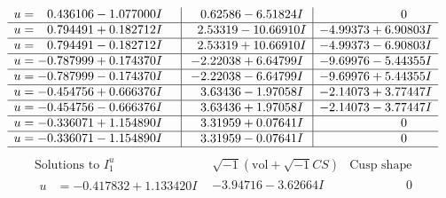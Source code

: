 \documentclass[1p]{elsarticle_modified}
\theoremstyle{definition}
\newcommand{\I}{\sqrt{-1}}
\begin{document}
$$\begin{array}{c|c|c}
\begin{aligned}
u &= \phantom{-}0.436106 - 1.077000 I\end{aligned}
 & \phantom{-}0.62586 - 6.51824 I & \phantom{-0.000000 } 0 \\ \hline\begin{aligned}
u &= \phantom{-}0.794491 + 0.182712 I\end{aligned}
 & \phantom{-}2.53319 - 10.66910 I & -4.99373 + 6.90803 I \\ \hline\begin{aligned}
u &= \phantom{-}0.794491 - 0.182712 I\end{aligned}
 & \phantom{-}2.53319 + 10.66910 I & -4.99373 - 6.90803 I \\ \hline\begin{aligned}
u &= -0.787999 + 0.174370 I\end{aligned}
 & -2.22038 + 6.64799 I & -9.69976 - 5.44355 I \\ \hline\begin{aligned}
u &= -0.787999 - 0.174370 I\end{aligned}
 & -2.22038 - 6.64799 I & -9.69976 + 5.44355 I \\ \hline\begin{aligned}
u &= -0.454756 + 0.666376 I\end{aligned}
 & \phantom{-}3.63436 - 1.97058 I & -2.14073 + 3.77447 I \\ \hline\begin{aligned}
u &= -0.454756 - 0.666376 I\end{aligned}
 & \phantom{-}3.63436 + 1.97058 I & -2.14073 - 3.77447 I \\ \hline\begin{aligned}
u &= -0.336071 + 1.154890 I\end{aligned}
 & \phantom{-}3.31959 + 0.07641 I & \phantom{-0.000000 } 0 \\ \hline\begin{aligned}
u &= -0.336071 - 1.154890 I\end{aligned}
 & \phantom{-}3.31959 - 0.07641 I & \phantom{-0.000000 } 0\\
 \hline 
 \end{array}$$\newpage$$\begin{array}{c|c|c}  
\text{Solutions to }I^u_{1}& \I (\text{vol} + \sqrt{-1}CS) & \text{Cusp shape}\\
 \hline 
\begin{aligned}
u &= -0.417832 + 1.133420 I\end{aligned}
 & -3.94716 - 3.62664 I & \phantom{-0.000000 } 0 \\ \hline\begin{aligned}

\end{aligned}
\end{array}$$
\end{document}
